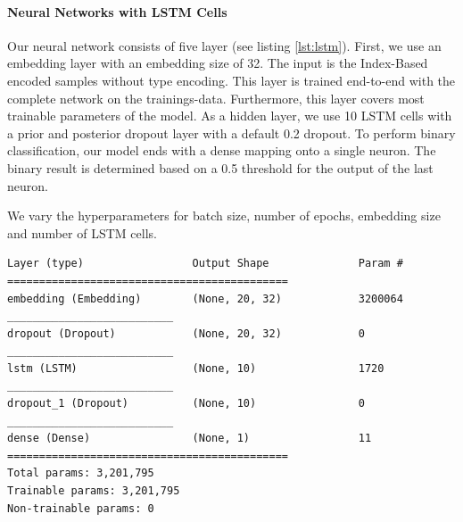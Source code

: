 \paragraph{Neural Networks with LSTM Cells}
Our neural network consists of five layer (see listing \ref{lst:lstm}). First, we use an embedding layer with an embedding size of 32. The input is the Index-Based encoded samples without type encoding. This layer is trained end-to-end with the complete network on the trainings-data. Furthermore, this layer covers most trainable parameters of the model. As a hidden layer, we use 10 LSTM cells with a prior and posterior dropout layer with a default 0.2 dropout. To perform binary classification, our model ends with a dense mapping onto a single neuron. The binary result is determined based on a 0.5 threshold for the output of the last neuron.

We vary the hyperparameters for batch size, number of epochs, embedding size and number of LSTM cells.

\begin{lstlisting}[label=lst:lstm, caption={Summary of our LSTM network. We use an embedding layer of size 32, 10 LSTM cells, a dropout layer before and after the LSTM layer with a defaut dropout ratio of 0.2 and a dense mapping to a single output neuron for binary classifcation with a threshold of 0.5.}]
Layer (type)                 Output Shape              Param #
============================================
embedding (Embedding)        (None, 20, 32)            3200064
__________________________
dropout (Dropout)            (None, 20, 32)            0
__________________________
lstm (LSTM)                  (None, 10)                1720
__________________________
dropout_1 (Dropout)          (None, 10)                0
__________________________
dense (Dense)                (None, 1)                 11
============================================
Total params: 3,201,795
Trainable params: 3,201,795
Non-trainable params: 0\end{lstlisting}